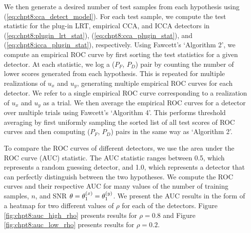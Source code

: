 We then generate a desired number of test samples from each hypothesis using
(\ref{eq:chpt8:cca_detect_model}). For each test sample, we compute the test statistic for the
plug-in LRT, empirical CCA, and ICCA detectors in (\ref{eq:chpt8:plugin_lrt_stat}),
(\ref{eq:chpt8:cca_plugin_stat}), and (\ref{eq:chpt8:icca_plugin_stat}), respectively. Using Fawcett's
\cite{fawcett2006introduction} `Algorithm 2', we compute an empirical ROC curve by first
sorting the test statistics for a given detector. At each statistic, we log a ($P_F$,
$P_D$) pair by counting the number of lower scores generated from each hypothesis. This is
repeated for multiple realizations of $u_x$ and $u_y$, generating multiple empirical ROC
curves for each detector. We refer to a single empirical ROC curve corresponding to a
realization of $u_x$ and $u_y$ as a trial. We then average the empirical ROC curves for a
detector over multiple trials using Fawcett's \cite{fawcett2006introduction} `Algorithm
4'. This performs threshold averaging by first uniformly sampling the sorted list of all
test scores of ROC curves and then computing ($P_F$, $P_D$) pairs in the same way as
`Algorithm 2'.

To compare the ROC curves of different detectors, we use the area under the ROC curve
(AUC) statistic. The AUC statistic ranges between 0.5, which represents a random guessing
detector, and 1.0, which represents a detector that can perfectly distinguish between the
two hypotheses. We compute the ROC curves and their respective AUC for many values of the
number of training samples, $n$, and SNR $\theta=\theta^{(x)}_1=\theta^{(y)}_1$. We present the AUC
results in the form of a heatmap for two different values of $\rho$ for each of the
detectors. Figure \ref{fig:chpt8:auc_high_rho} presents results for $\rho=0.8$ and Figure
\ref{fig:chpt8:auc_low_rho} presents results for $\rho = 0.2$.

